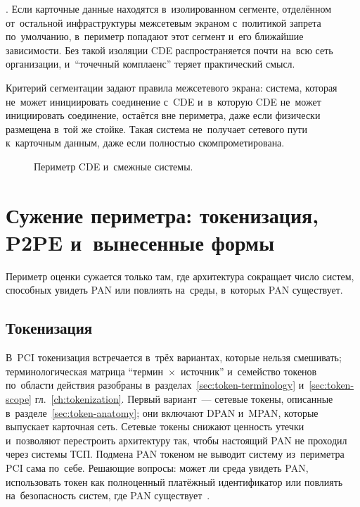 .
Если карточные данные находятся в~изолированном сегменте, отделённом
от~остальной инфраструктуры межсетевым экраном с~политикой запрета
по~умолчанию, в~периметр попадают этот сегмент и~его ближайшие зависимости.
Без такой изоляции CDE распространяется почти на~всю сеть организации,
и~\enquote{точечный комплаенс} теряет практический смысл.

Критерий сегментации задают правила межсетевого экрана: система, которая
не~может инициировать соединение с~CDE и~в~которую CDE не~может инициировать
соединение, остаётся вне периметра, даже если физически размещена в~той же
стойке. Такая система не~получает сетевого пути к~карточным данным, даже если
полностью скомпрометирована.


\begin{figure}[tbp]
  \centering
  \caption{Периметр CDE и~смежные системы.}\label{fig:pci-cde-boundary}
\end{figure}

\section{Сужение периметра: токенизация, P2PE и~вынесенные формы}\label{sec:pci-scope-reduction}

Периметр оценки сужается только там, где архитектура сокращает число систем,
способных увидеть PAN или повлиять на~среды, в~которых PAN существует.

\subsection*{Токенизация}

В~PCI токенизация встречается в~трёх вариантах, которые нельзя смешивать;
терминологическая матрица \enquote{термин~$\times$~источник} и~семейство
токенов по~области действия разобраны
в~разделах~\ref{sec:token-terminology} и~\ref{sec:token-scope}
гл.~\ref{ch:tokenization}. Первый вариант~--- сетевые токены, описанные
в~разделе~\ref{sec:token-anatomy}; они включают DPAN и~MPAN, которые выпускает
карточная сеть. Сетевые токены снижают ценность утечки и~позволяют перестроить
архитектуру так, чтобы настоящий PAN не проходил через системы ТСП. Подмена PAN
токеном не выводит систему из~периметра PCI сама по~себе. Решающие вопросы:
может ли среда увидеть PAN, использовать токен как полноценный платёжный
идентификатор или повлиять на~безопасность систем, где PAN
существует~\cite{pci-dss-4}.

